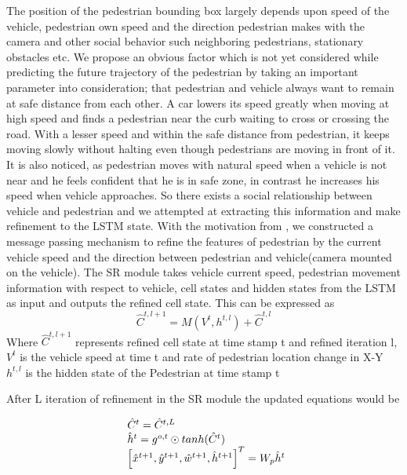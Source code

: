 The position of the pedestrian bounding box largely depends upon speed of the vehicle, pedestrian own speed and the direction pedestrian makes with the camera and other social behavior such neighboring pedestrians, stationary obstacles etc. We propose an obvious factor which is not yet considered while predicting the future trajectory of the pedestrian by taking an important parameter into consideration; that pedestrian and vehicle always want to remain at safe distance from each other. A car lowers its speed greatly when moving at high speed and finds a pedestrian near the curb waiting to cross or crossing the road. With a lesser speed and within the safe distance from pedestrian, it keeps moving slowly without halting even though pedestrians are moving in front of it.
It is also noticed, as pedestrian moves with natural speed when a vehicle is not near and he feels confident that he is in safe zone, in contrast he increases his speed when vehicle approaches. So there exists a social relationship between vehicle and pedestrian and we attempted at extracting this information and make refinement to the LSTM state. With the motivation from \cite{zhang2019sr}, we constructed a message passing mechanism to refine the features of pedestrian by the current vehicle speed and the direction between pedestrian and vehicle(camera mounted on the vehicle). The SR module takes vehicle current speed, pedestrian movement information with respect to vehicle, cell states and hidden states from the LSTM as input and outputs the refined cell state. This can be expressed as 
%
\begin{equation}
\hat{C}^{t, l+1}= M(V^t, {h}^{t, l}) + \hat{C}^{t, l}
\end{equation}
Where $\hat{C}^{t, l+1}$ represents refined cell state at time stamp t and refined iteration l, $V^t$ is the vehicle speed at time t and rate of pedestrian location change in X-Y \\
${h}^{t, l}$ is the hidden state of the Pedestrian at time stamp t

After L iteration of refinement in the SR module the updated equations would be

\begin{equation}
\begin{array}{l@{}}
\hat{C}^{t}=\hat{C}^{t, L} \\
\hat{h}^{t}={g}^{o,t} \odot tanh(\hat{C}^{t}) \\
\left[ \hat{x}^{t+1}, \hat{y}^{t+1}, \hat{w}^{t+1}, \hat{h}^{t+1} \right] ^ T = W_p\hat{h}^{t}
\end{array}
\end{equation}

